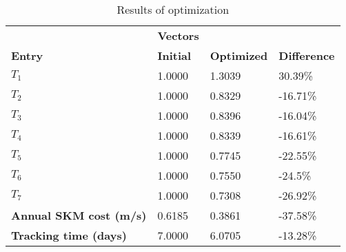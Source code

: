 \begin{table}[H]
\centering
\begin{tabular}{llll}
\textbf{}      & \cellcolor[HTML]{EFEFEF}\textbf{Vectors} & \textbf{} & \textbf{}         \\
\rowcolor[HTML]{EFEFEF} 
\textbf{Entry} & \textbf{Initial} & \textbf{Optimized} & \textbf{Difference} \\
$T_1$ & 1.0000 & 1.3039 & 30.39\% \\ 
$T_2$ & 1.0000 & 0.8329 & -16.71\% \\ 
$T_3$ & 1.0000 & 0.8396 & -16.04\% \\ 
$T_4$ & 1.0000 & 0.8339 & -16.61\% \\ 
$T_5$ & 1.0000 & 0.7745 & -22.55\% \\ 
$T_6$ & 1.0000 & 0.7550 & -24.5\% \\ 
$T_7$ & 1.0000 & 0.7308 & -26.92\% \\ 
\rowcolor[HTML]{EFEFEF} 
\textbf{Annual SKM cost (m/s)}  & 0.6185 & 0.3861 & -37.58\% \\ 
\rowcolor[HTML]{EFEFEF} 
\textbf{Tracking time (days)}  & 7.0000 & 6.0705 & -13.28\% \\ 
\end{tabular}
\caption{Results of optimization}
\label{tab:OptimizationAnalysis}
\end{table}